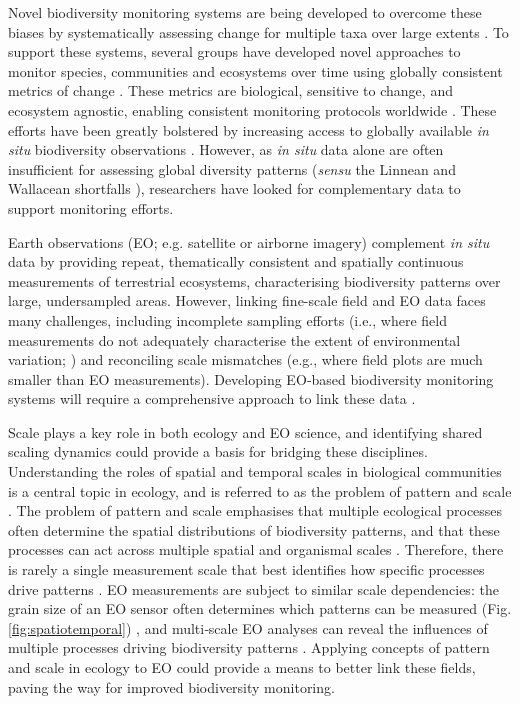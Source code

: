 Novel biodiversity monitoring systems are being developed to overcome these biases by systematically assessing change for multiple taxa over large extents \cite{Scholes2008-ta,Scholes2012-ec,Fernandez2015-na}. To support these systems, several groups have developed novel approaches to monitor species, communities and ecosystems over time using globally consistent metrics of change \cite{Butchart2010-we, Jetz2012-mw, Metzger2013-mz, Pereira2013-pk}. These metrics are biological, sensitive to change, and ecosystem agnostic, enabling consistent monitoring protocols worldwide \cite{Geo_bon2017-ak}. These efforts have been greatly bolstered by increasing access to globally available \textit{in situ} biodiversity observations \cite{Geijzendorffer2016-xv, Culina2018-ih}. However, as \textit{in situ} data alone are often insufficient for assessing global diversity patterns (\textit{sensu} the Linnean and Wallacean shortfalls \cite{Bini2006-an, Brito2010-gs}), researchers have looked for complementary data to support monitoring efforts.

Earth observations (EO; e.g. satellite or airborne imagery) complement \textit{in situ} data by providing repeat, thematically consistent and spatially continuous measurements of terrestrial ecosystems, characterising biodiversity patterns over large, undersampled areas. However, linking fine-scale field and EO data faces many challenges, including incomplete sampling efforts (i.e., where field measurements do not adequately characterise the extent of environmental variation; \cite{Marvin2014-ms}) and reconciling scale mismatches (e.g., where field plots are much smaller than EO measurements). Developing EO‐based biodiversity monitoring systems will require a comprehensive approach to link these data \cite{Turner2014-kq,Pettorelli2016-wi}.

Scale plays a key role in both ecology and EO science, and identifying shared scaling dynamics could provide a basis for bridging these disciplines. Understanding the roles of spatial and temporal scales in biological communities is a central topic in ecology, and is referred to as the problem of pattern and scale \cite{Wiens1989-yi,Levin1992-ga}. The problem of pattern and scale emphasises that multiple ecological processes often determine the spatial distributions of biodiversity patterns, and that these processes can act across multiple spatial and organismal scales \cite{Withers1999-ls,Waring2010-cl,Chase2013-gl}. Therefore, there is rarely a single measurement scale that best identifies how specific processes drive patterns \cite{Hutchinson1953-md}. EO measurements are subject to similar scale dependencies: the grain size of an EO sensor often determines which patterns can be measured (Fig. \ref{fig:spatiotemporal}) \cite{Lechner2010-pi,Anderson2012-ql,Nagendra2013-gn}, and multi‐scale EO analyses can reveal the influences of multiple processes driving biodiversity patterns \cite{Keil2012-ad,Taylor2015-ql}. Applying concepts of pattern and scale in ecology to EO could provide a means to better link these fields, paving the way for improved biodiversity monitoring.

